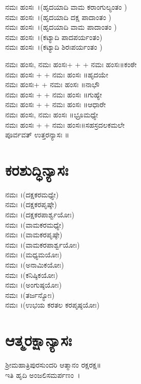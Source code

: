  ನಮಃ ಹಂಸಃ~।(ಹೃದಯಾದಿ ವಾಮ ಕರಾಂಗುಲ್ಯಂತಂ )\\
 ನಮಃ ಹಂಸಃ~।(ಹೃದಯಾದಿ ದಕ್ಷ ಪಾದಾಂತಂ )\\
 ನಮಃ ಹಂಸಃ~।(ಹೃದಯಾದಿ ವಾಮ ಪಾದಾಂತಂ )\\
 ನಮಃ ಹಂಸಃ~।(ಕಟ್ಯಾದಿ ಪಾದಪರ್ಯಂತಂ)\\
 ನಮಃ ಹಂಸಃ~।(ಕಟ್ಯಾದಿ ಶಿರಃಪರ್ಯಂತಂ )\\

 ನಮಃ ಹಂಸಃ,  ನಮಃ ಹಂಸಃ+ + + ನಮಃ ಹಂಸಃ॥ಕಂಠೇ\\
 ನಮಃ ಹಂಸಃ + +  ನಮಃ ಹಂಸಃ ॥ಹೃದಯೇ\\
 ನಮಃ ಹಂಸಃ+ +  ನಮಃ ಹಂಸಃ ॥ನಾಭೌ\\
 ನಮಃ ಹಂಸಃ + +  ನಮಃ ಹಂಸಃ ॥ಗುಹ್ಯೇ\\
 ನಮಃ ಹಂಸಃ + +  ನಮಃ ಹಂಸಃ ॥ಆಧಾರೇ\\
 ನಮಃ ಹಂಸಃ,  ನಮಃ ಹಂಸಃ ॥ಭ್ರೂಮಧ್ಯೇ\\
 ನಮಃ ಹಂಸಃ + + ನಮಃ ಹಂಸಃ॥ಸಹಸ್ರದಲಕಮಲೇ\\
 ಪೂರ್ವವತ್ ಉತ್ತರನ್ಯಾಸಃ ॥
\section{ಕರಶುದ್ಧಿನ್ಯಾಸಃ}
 ನಮಃ ।(ದಕ್ಷಕರಮಧ್ಯೇ)\\
 ನಮಃ ।(ದಕ್ಷಕರಪೃಷ್ಠೇ)\\
 ನಮಃ ।(ದಕ್ಷಕರಪಾರ್ಶ್ವಯೋಃ)\\
 ನಮಃ ।(ವಾಮಕರಮಧ್ಯೇ)\\
 ನಮಃ ।(ವಾಮಕರಪೃಷ್ಠೇ)\\
 ನಮಃ ।(ವಾಮಕರಪಾರ್ಶ್ವಯೋಃ)\\
 ನಮಃ ।(ಮಧ್ಯಮಯೋಃ)\\
 ನಮಃ ।(ಅನಾಮಿಕಯೋಃ)\\
 ನಮಃ ।(ಕನಿಷ್ಠಿಕಯೋಃ)\\
 ನಮಃ ।(ಅಂಗುಷ್ಠಯೋಃ)\\
 ನಮಃ ।(ತರ್ಜನ್ಯೋಃ)\\
 ನಮಃ ।(ಉಭಯ ಕರತಲ ಕರಪೃಷ್ಠಯೋಃ)
\section{ಆತ್ಮರಕ್ಷಾನ್ಯಾಸಃ}
 ಶ್ರೀಮಹಾತ್ರಿಪುರಸುಂದರಿ ಆತ್ಮಾನಂ ರಕ್ಷರಕ್ಷ॥\\ಇತಿ ಹೃದಿ ಅಂಜಲಿಸಮರ್ಪಣಂ~।

